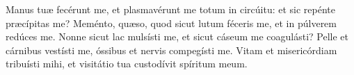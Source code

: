 Manus tuæ fecérunt me, et plasmavérunt me totum in circúitu:
	et sic repénte præcípitas me?
Meménto, quæso, quod sicut lutum féceris me, et in púlverem redúces me.
Nonne sicut lac mulsísti me,
		et sicut cáseum me coagulásti?
Pelle et cárnibus vestísti me, óssibus et nervis compegísti me.
Vitam et misericórdiam tribuísti mihi,
	et visitátio tua custodívit spíritum meum.
